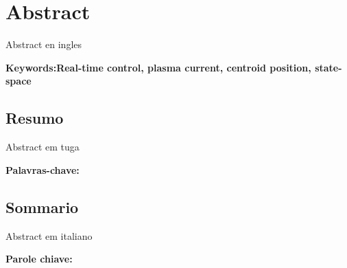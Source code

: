 \chapter*{Abstract}
Abstract en ingles

\vfill

\textbf{Keywords:Real-time control, plasma current, centroid position, state-space} 

\pagebreak
\begin{otherlanguage}{portuguese}
\chapter*{Resumo}
Abstract em tuga

\vfill

\textbf{ Palavras-chave: } 
\end{otherlanguage}
\pagebreak
\begin{otherlanguage}{italian}
\chapter*{Sommario}

Abstract em italiano


\vfill

\textbf{Parole chiave:} 
\end{otherlanguage}




